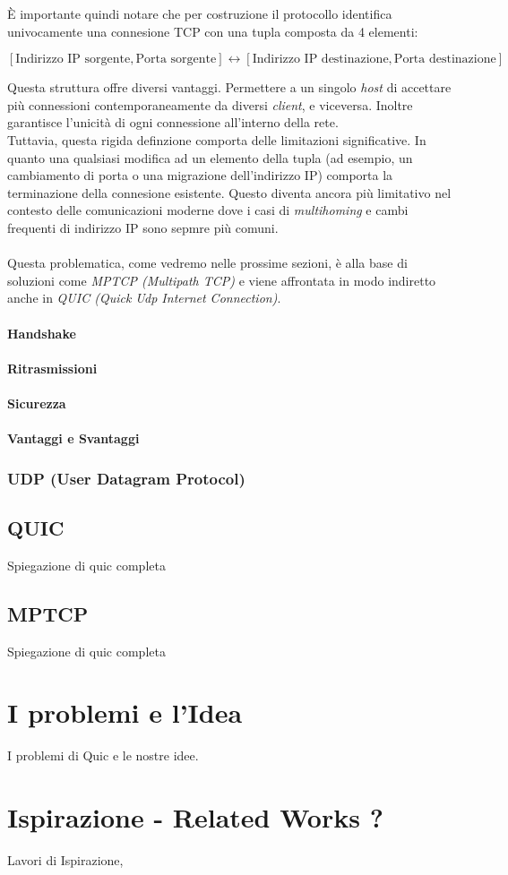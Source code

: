 È importante quindi notare che per costruzione il protocollo identifica univocamente una connesione TCP con una tupla composta da 4 elementi:

\begin{center}
    \small
    $[\text{Indirizzo IP sorgente}, \text{Porta sorgente}] \leftrightarrow [\text{Indirizzo IP destinazione}, \text{Porta destinazione}]$
\end{center}

Questa struttura offre diversi vantaggi. Permettere a un singolo \emph{host} di accettare più connessioni contemporaneamente da diversi \emph{client}, e viceversa. Inoltre garantisce l'unicità di ogni connessione all'interno della rete.
\\
Tuttavia, questa rigida definzione comporta delle limitazioni significative. In quanto una qualsiasi modifica ad un elemento della tupla (ad esempio, un cambiamento di porta o una migrazione dell'indirizzo IP) comporta la terminazione della connesione esistente. Questo diventa ancora più limitativo nel contesto delle comunicazioni moderne dove i casi di \emph{multihoming \glsfirstoccur} e cambi frequenti di indirizzo IP sono sepmre più comuni.
\\
\\
Questa problematica, come vedremo nelle prossime sezioni, è alla base di soluzioni come \emph{MPTCP (Multipath TCP)} e viene affrontata in modo indiretto anche in \emph{QUIC (Quick Udp Internet Connection)}.
\paragraph{ Handshake }
\paragraph{ Ritrasmissioni }
\paragraph{ Sicurezza }
\paragraph{ Vantaggi e Svantaggi }
\subsubsection{UDP (User Datagram Protocol)}

\subsection{QUIC}

Spiegazione di quic completa

\subsection{MPTCP}

Spiegazione di quic completa

\section{I problemi e l'Idea}

I problemi di Quic e le nostre idee.

\section{Ispirazione - Related Works ?}

Lavori di Ispirazione, 

